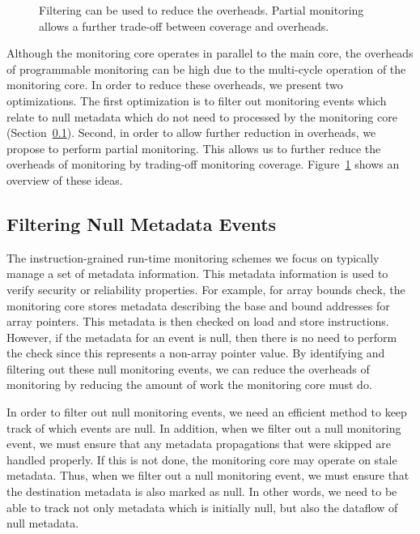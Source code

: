 \begin{figure}
\begin{center}
    \vspace{-0.2in}
    \caption{Filtering can be used to reduce the overheads. Partial monitoring
    allows a further trade-off between coverage and overheads.}
    \label{fig:optimizations.overview}
    \vspace{-0.1in}
  \end{center}
\end{figure}

Although the monitoring core operates in parallel to the main core, the
overheads of programmable monitoring can be high due to the multi-cycle
operation of the monitoring core.
 In order to reduce these overheads, we present two
optimizations. The first optimization is to filter out monitoring events which relate to
null metadata which do not need to processed by the monitoring core (Section~\ref{sec:optimizations.filter}). Second, in order to allow
further reduction in overheads, we propose to perform partial monitoring. This
allows us to further reduce the overheads of monitoring by trading-off
monitoring coverage. Figure~\ref{fig:optimizations.overview} shows an overview
of
these ideas.

\subsection{Filtering Null Metadata Events}
\label{sec:optimizations.filter}

The instruction-grained run-time monitoring schemes we focus on typically
manage a set of metadata information. This metadata information is used to
verify security or reliability properties. For example, for array bounds
check, the monitoring core stores metadata describing the base and bound
addresses for array pointers. This metadata is then checked on load and store
instructions. However, if the metadata for an event is null, then there is no
need to perform the check since this represents a non-array pointer value. By
identifying and filtering out these null monitoring events, we can reduce the
overheads of
monitoring by reducing the amount of work the monitoring core must do.

In order to filter out null monitoring events, we need an efficient method to
keep track of which events are null. In addition, when we filter out a null
monitoring event, we must ensure that any metadata propagations that were
skipped are handled properly. If this is not done, the monitoring core may
operate on stale metadata. Thus, when we filter out a null monitoring event,
we must ensure that the destination metadata is also marked as null. 
In other words, we need to be able to track not only
metadata which is initially null, but also the dataflow of null metadata. 

